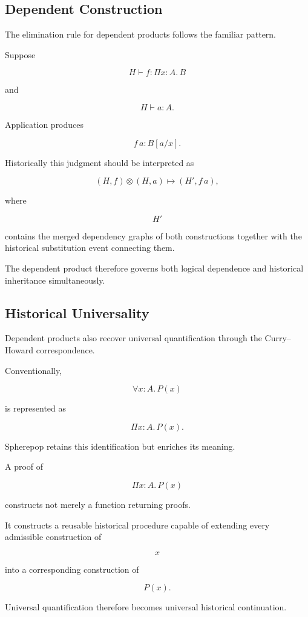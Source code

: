 \documentclass[12pt,oneside]{article}
\theoremstyle{definition}
\theoremstyle{remark}
\begin{document}
\subsection{Dependent Construction}

The elimination rule for dependent products follows the familiar pattern.

Suppose

\[
H
\vdash
f
:
\Pi x:A.\,B
\]

and

\[
H
\vdash
a:A.
\]

Application produces

\[
f\,a
:
B[a/x].
\]

Historically this judgment should be interpreted as

\[
(H,f)
\otimes
(H,a)
\longmapsto
(H',f\,a),
\]

where

\[
H'
\]

contains the merged dependency graphs of both constructions together with the
historical substitution event connecting them.

The dependent product therefore governs both logical dependence and historical
inheritance simultaneously.

\subsection{Historical Universality}

Dependent products also recover universal quantification through the
Curry--Howard correspondence.

Conventionally,

\[
\forall x:A.\,P(x)
\]

is represented as

\[
\Pi x:A.\,P(x).
\]

Spherepop retains this identification but enriches its meaning.

A proof of

\[
\Pi x:A.\,P(x)
\]

constructs not merely a function returning proofs.

It constructs a reusable historical procedure capable of extending every
admissible construction of

\[
x
\]

into a corresponding construction of

\[
P(x).
\]

Universal quantification therefore becomes universal historical continuation.
\end{document}
